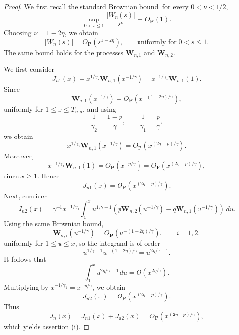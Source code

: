 \documentclass[reqno,openbib,runningheads,a4paper,12pt]{amsart}%
\begin{document}
\begin{proof}
We first recall the standard Brownian bound: for every $0<\nu<1/2$,
\[
\sup_{0<s\leq1}\frac{|W_{n}(s)|}{s^{\nu}}=O_{\mathbf{P}}(1).
\]
Choosing $\nu=1-2\eta$, we obtain
\[
|W_{n}(s)|=O_{\mathbf{P}}(s^{1-2\eta}),\qquad\text{uniformly for }0<s\leq1.
\]
The same bound holds for the processes $\mathbf{W}_{n,1}$ and $\mathbf{W}%
_{n,2}$.\smallskip

\noindent We first consider
\[
J_{n1}(x)=x^{1/\gamma_{2}}\mathbf{W}_{n,1}(x^{-1/\gamma})-x^{-1/\gamma_{1}%
}\mathbf{W}_{n,1}(1).
\]
Since
\[
\mathbf{W}_{n,1}(x^{-1/\gamma})=O_{\mathbf{P}}\!\left(  x^{-(1-2\eta)/\gamma
}\right)  ,
\]
uniformly for $1\leq x\leq T_{n,a}$, and using
\[
\frac{1}{\gamma_{2}}=\frac{1-p}{\gamma},\qquad\frac{1}{\gamma_{1}}=\frac
{p}{\gamma},
\]
we obtain
\[
x^{1/\gamma_{2}}\mathbf{W}_{n,1}(x^{-1/\gamma})=O_{\mathbf{P}}\!\left(
x^{(2\eta-p)/\gamma}\right)  .
\]
Moreover,
\[
x^{-1/\gamma_{1}}\mathbf{W}_{n,1}(1)=O_{\mathbf{P}}\!\left(  x^{-p/\gamma
}\right)  =O_{\mathbf{P}}\!\left(  x^{(2\eta-p)/\gamma}\right)  ,
\]
since $x\geq1$. Hence
\[
J_{n1}(x)=O_{\mathbf{P}}\!\left(  x^{(2\eta-p)/\gamma}\right)  .
\]
Next, consider
\[
J_{n2}(x)=\gamma^{-1}x^{-1/\gamma_{1}}\int_{1}^{x}u^{1/\gamma-1}\left(
p\mathbf{W}_{n,2}(u^{-1/\gamma})-q\mathbf{W}_{n,1}(u^{-1/\gamma})\right)
\,du.
\]
Using the same Brownian bound,
\[
\mathbf{W}_{n,i}(u^{-1/\gamma})=O_{\mathbf{P}}\!\left(  u^{-(1-2\eta)/\gamma
}\right)  ,\qquad i=1,2,
\]
uniformly for $1\leq u\leq x$, so the integrand is of order
\[
u^{1/\gamma-1}u^{-(1-2\eta)/\gamma}=u^{2\eta/\gamma-1}.
\]
It follows that
\[
\int_{1}^{x}u^{2\eta/\gamma-1}\,du=O\!\left(  x^{2\eta/\gamma}\right)  .
\]
Multiplying by $x^{-1/\gamma_{1}}=x^{-p/\gamma}$, we obtain
\[
J_{n2}(x)=O_{\mathbf{P}}\!\left(  x^{(2\eta-p)/\gamma}\right)  .
\]
Thus,
\[
J_{n}(x)=J_{n1}(x)+J_{n2}(x)=O_{\mathbf{P}}\!\left(  x^{(2\eta-p)/\gamma
}\right)  ,
\]
which yields assertion (i).\smallskip


\end{proof}
\end{document}
